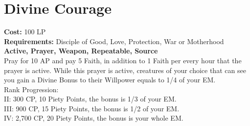 \section{Divine Courage}\label{prayer:divineCourage}
\textbf{Cost:} 100 LP\\
\textbf{Requirements:} Disciple of Good, Love, Protection, War or Motherhood\\
\textbf{Active, Prayer, Weapon, Repeatable, Source}\\
Pray for 10 AP and pay 5 Faith, in addition to 1 Faith per every hour that the prayer is active.
While this prayer is active, creatures of your choice that can see you gain a Divine Bonus to their Willpower equals to 1/4 of your EM.
\\
Rank Progression:\\
II: 300 CP, 10 Piety Points, the bonus is 1/3 of your EM.\\
III: 900 CP, 15 Piety Points, the bonus is 1/2 of your EM.\\
IV: 2,700 CP, 20 Piety Points, the bonus is your whole EM.\\